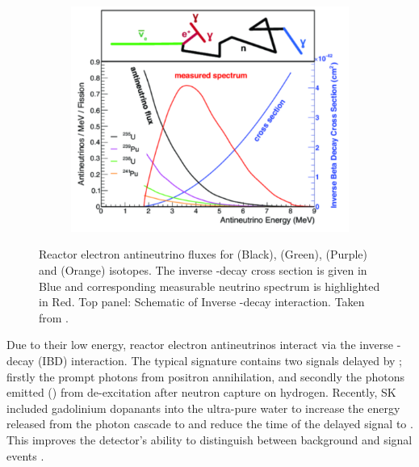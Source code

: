 \begin{figure}[h]
  \begin{subfigure}[t]{0.90\textwidth}
    \includegraphics[width=\textwidth, trim={0mm 0mm 0mm 0mm}, clip,page=1]{Figures/Theory/ReactorNeutrinoProduction.pdf}
  \end{subfigure}
  \caption{Reactor electron antineutrino fluxes for  (Black),  (Green),  (Purple) and  (Orange) isotopes. The inverse \quickmath{\beta}-decay cross section is given in Blue and corresponding measurable neutrino spectrum is highlighted in Red. Top panel: Schematic of Inverse \quickmath{\beta}-decay interaction. Taken from \cite{SajjadAthar:2021prg}.}
  \label{fig:NeutrinoOscillationPhysics_ReactorNeutrinoProduction}
\end{figure}

Due to their low energy, reactor electron antineutrinos interact via the inverse \quickmath{\beta}-decay (IBD) interaction. The typical signature contains two signals delayed by ; firstly the prompt photons from positron annihilation, and secondly the photons emitted () from de-excitation after neutron capture on hydrogen. Recently, SK included gadolinium dopanants into the ultra-pure water to increase the energy released from the photon cascade to  and reduce the time of the delayed signal to . This improves the detector's ability to distinguish between background and signal events \cite{Abe2022-ij}.

